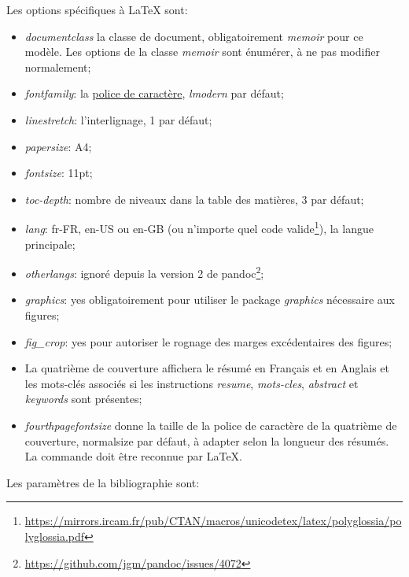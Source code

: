 \documentclass[
  11pt,
  american,
  a4paper,
  extrafontsizes,onecolumn,openright
  ]{memoir}
\providecommand{\tightlist}{%
  \setlength{\itemsep}{0pt}\setlength{\parskip}{0pt}}
\begin{document}
Les options spécifiques à LaTeX sont:

\begin{itemize}
\tightlist
\item
  \emph{documentclass} la classe de document, obligatoirement \emph{memoir} pour ce modèle. Les options de la classe \emph{memoir} sont énumérer, à ne pas modifier normalement;
\item
  \emph{fontfamily}: la \href{https://en.wikibooks.org/wiki/LaTeX/Fonts\#Font_families}{police de caractère}, \emph{lmodern} par défaut;
\item
  \emph{linestretch}: l'interlignage, 1 par défaut;
\item
  \emph{papersize}: A4;
\item
  \emph{fontsize}: 11pt;
\item
  \emph{toc-depth}: nombre de niveaux dans la table des matières, 3 par défaut;
\item
  \emph{lang}: fr-FR, en-US ou en-GB (ou n'importe quel code valide\footnote{\url{https://mirrors.ircam.fr/pub/CTAN/macros/unicodetex/latex/polyglossia/polyglossia.pdf}}), la langue principale;
\item
  \emph{otherlangs}: ignoré depuis la version 2 de pandoc\footnote{\url{https://github.com/jgm/pandoc/issues/4072}};
\item
  \emph{graphics}: yes obligatoirement pour utiliser le package \emph{graphics} nécessaire aux figures;
\item
  \emph{fig\_crop}: yes pour autoriser le rognage des marges excédentaires des figures;
\item
  La quatrième de couverture affichera le résumé en Français et en Anglais et les mots-clés associés si les instructions \emph{resume}, \emph{mots-cles}, \emph{abstract} et \emph{keywords} sont présentes;
\item
  \emph{fourthpagefontsize} donne la taille de la police de caractère de la quatrième de couverture, normalsize par défaut, à adapter selon la longueur des résumés. La commande doit être reconnue par LaTeX.
\end{itemize}

Les paramètres de la bibliographie sont:
\end{document}
